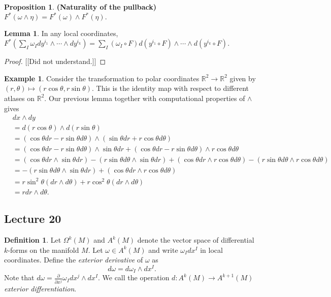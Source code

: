 \documentclass[10pt,letterpaper,cm]{nupset}
\theoremstyle{definition}
\newtheorem*{definition}{Definition}
\newtheorem{exmp}{Example}
\newtheorem{lemma}{Lemma}
\newtheorem{prop}{Proposition}
\newcommand{\R}{\mathbb R}
\newcommand{\1}{\mathbf{1}}
\newcommand{\0}{\vec 0}
\begin{document}
\begin{prop}{\textbf{(Naturality of the pullback)}}
$F^{\ast}(\omega \wedge \eta) = F^{\ast}(\omega) \wedge F^{\ast}(\eta).$
\end{prop}

\begin{lemma}
In any local coordinates, $F^{\ast}(\sum_I \omega_I dy^{i_1} \wedge \cdots \wedge dy^{i_k}) = \sum_I (\omega_I \circ F)d(y^{i_1} \circ F) \wedge \cdots \wedge d(y^{i_k} \circ F).$
\end{lemma}
\begin{proof}
{[[Did not understand.]]}
\end{proof}

\begin{exmp}
Consider the transformation to polar coordinates $\R^2 \to \R^2$ given by $(r, \theta) \mapsto (r\cos \theta, r\sin \theta)$. This is the identity map with respect to different atlases on $\R^2$. Our previous lemma together with computational properties of $\wedge$ gives
\begin{align*} & dx \wedge dy \\ & = d(r\cos \theta) \wedge d(r\sin \theta) \\ &=   (\cos \theta dr - r\sin \theta d\theta) \wedge (\sin \theta dr +r \cos \theta d\theta) \\ &= (\cos \theta dr - r\sin \theta d\theta) \wedge \sin \theta dr + (\cos \theta dr - r\sin \theta d\theta) \wedge r \cos \theta d\theta \\ & = (\cos \theta dr \wedge \sin \theta dr) - (r \sin \theta d \theta \wedge \sin \theta dr) +  (\cos \theta dr \wedge r \cos \theta d\theta) - (r\sin \theta d \theta \wedge r \cos \theta d \theta)\\ & =  - (r \sin \theta d \theta \wedge \sin \theta dr) +  (\cos \theta dr \wedge r \cos \theta d\theta) \\ & = r\sin^2\theta(dr \wedge d\theta) + r\cos^2 \theta(dr \wedge d\theta)\\ & = rdr \wedge d\theta.
\end{align*}
\end{exmp}

\subsection{Lecture 20}

\begin{definition}
Let $\Omega^k(M)$ and $A^k(M)$ denote the vector space of differential $k$-forms on the manifold $M$. 
Let $\omega \in A^k(M)$ and write $\omega_I dx^I$ in local coordinates. Define the \textit{exterior derivative} of $\omega$ as $$d\omega = d \omega_I \wedge dx^I.$$ Note that $d \omega = \frac{\partial}{\partial{x^j}}\omega_I dx^j \wedge dx^I.$ We call the operation $d : A^k(M) \to A^{k+1}(M)$ \textit{exterior differentiation}.
\end{definition}
\end{document}

